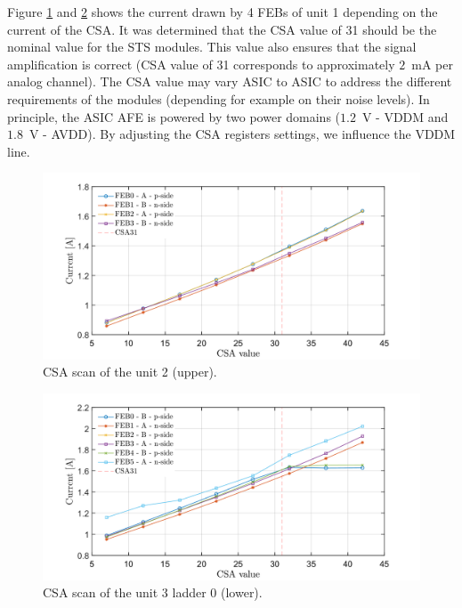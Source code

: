\newpage
Figure \ref{fig_power3} and \ref{fig_power4} shows the current drawn by 4 \glspl{FEB} of unit 1 depending on the current of the \gls{CSA}. It was determined that the \gls{CSA} value of 31 should be the nominal value for the \gls{STS} modules. This value also ensures that the signal amplification is correct (\gls{CSA} value of 31 corresponds to approximately $2$~mA per analog channel). The \gls{CSA} value may vary \gls{ASIC} to \gls{ASIC} to address the different requirements of the modules (depending for example on their noise levels). In principle, the \gls{ASIC} \gls{AFE} is powered by two power domains ($1.2$~V - VDDM and $1.8$~V - AVDD). By adjusting the \gls{CSA} registers settings, we influence the VDDM line. 
\begin{figure}[h!]
\centering
\includegraphics[width=0.9\columnwidth]{Chapter6/DCS/images/U0CSABIAS.png}
\caption{CSA scan of the unit 2 (upper).}
\label{fig_power3}
\end{figure}
\begin{figure}[h!]
\centering
\includegraphics[width=0.9\columnwidth]{Chapter6/DCS/images/U3L0CSABIAS.png}
\caption{CSA scan of the unit 3 ladder 0 (lower).}
\label{fig_power4}
\end{figure}

